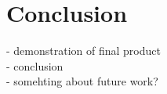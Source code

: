 \documentclass{article}
\begin{document}
\section{Conclusion}
 - demonstration of final product\\
 - conclusion\\
 - somehting about future work?



\end{document}
